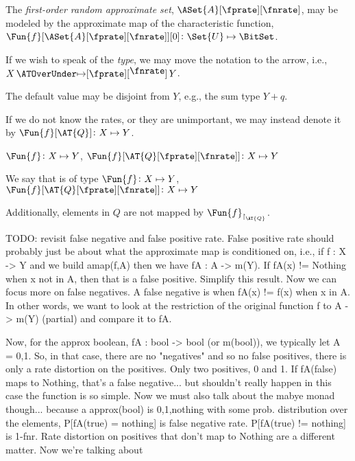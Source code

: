 \documentclass[ ../main.tex]{subfiles}
\begin{document}
The \emph{first-order random approximate set}, $\ASet{A}[\fprate][\fnrate]$, may be modeled by the approximate map of the characteristic function, $\Fun{f}[\ASet{A}[\fprate][\fnrate]][0] \colon \Set{U} \mapsto \BitSet$.

If we wish to speak of the \emph{type}, we may move the notation to the arrow, i.e., $X \amapsto{\fprate}{\fnrate} Y$.

The default value may be disjoint from $Y$, e.g., the sum type $Y + q$.

If we do not know the rates, or they are unimportant, we may instead denote it by $\Fun{f}[\AT{Q}] \colon X \mapsto Y$.


$\Fun{f} \colon X \mapsto Y$, $\Fun{f}[\AT{Q}[\fprate][\fnrate]] \colon X \mapsto Y$

We say that is of type 
$\Fun{f} \colon X \mapsto Y$, $\Fun{f}[\AT{Q}[\fprate][\fnrate]] \colon X \mapsto Y$


Additionally, elements in $Q$ are not mapped by $\Fun{f}_{\restriction_{\AT{Q}}}$.



TODO: revisit false negative and false positive rate. False positive rate should probably just be about what the approximate map is conditioned on, i.e., if f : X -> Y and we build amap(f,A) then we have fA : A -> m(Y). If fA(x) != Nothing when x not in A, then that is a false positive. Simplify this result. Now we can focus more on false negatives. A false negative is when fA(x) != f(x) when x in A. In other words, we want to look at the restriction of the original function f to A -> m(Y) (partial) and compare it to fA.

Now, for the approx boolean, fA : bool -> bool (or m(bool)), we typically let A = {0,1}. So, in that case, there are no "negatives" and so no false positives, there is only a rate distortion on the positives. Only two positives, 0 and 1. If fA(false) maps to Nothing, that's a false negative... but shouldn't really happen in this case the function is so simple. Now we must also talk about the mabye monad though... because a approx(bool) is {0,1,nothing} with some prob. distribution over the elements, P[fA(true) = nothing] is false negative rate. P[fA(true) != nothing] is 1-fnr. Rate distortion on positives that don't map to Nothing are a different matter. Now we're talking about 
\end{document}

